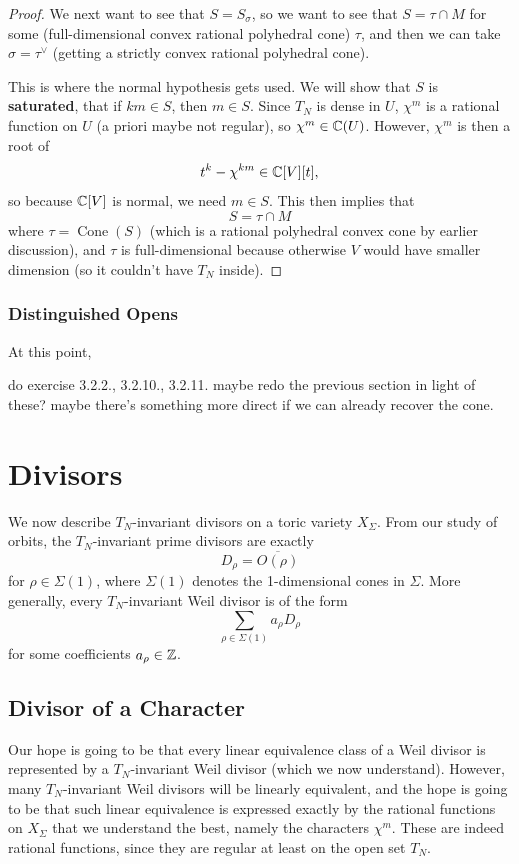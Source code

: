 \documentclass[12pt]{article}
\DeclareMathOperator{\Cone}{Cone}
\begin{document}
\begin{proof}
    We next want to see that $S=S_\sigma$, so we want to see that $S=\tau \cap M$ for some (full-dimensional convex rational polyhedral cone) $\tau$, and then we can take $\sigma = \tau^\vee$ (getting a strictly convex rational polyhedral cone).

    This is where the normal hypothesis gets used. We will show that $S$ is \textbf{saturated}, that if $km\in S$, then $m\in S$. Since $T_N$ is dense in $U$, $\chi^m$ is a rational function on $U$ (a priori maybe not regular), so $\chi^m \in \mathbb{C}(U)$. However, $\chi^m$ is then a root of
    \[t^k - \chi^{km} \in \mathbb{C}[V][t],\]
    so because $\mathbb{C}[V]$ is normal, we need $m \in S$. This then implies that
    \[S = \tau \cap M\]
    where $\tau = \Cone(S)$ (which is a rational polyhedral convex cone by earlier discussion), and $\tau$ is full-dimensional because otherwise $V$ would have smaller dimension (so it couldn't have $T_N$ inside).
\end{proof}

\subsubsection{Distinguished Opens}



At this point, 

do exercise 3.2.2., 3.2.10., 3.2.11.
maybe redo the previous section in light of these? maybe there's something more direct if we can already recover the cone.

\section{Divisors}

We now describe $T_N$-invariant divisors on a toric variety $X_\Sigma$. From our study of orbits, the $T_N$-invariant prime divisors are exactly
\[D_\rho = \overline{O(\rho)}\]
for $\rho \in \Sigma(1)$, where $\Sigma(1)$ denotes the 1-dimensional cones in $\Sigma$. More generally, every $T_N$-invariant Weil divisor is of the form
\[\sum_{\rho\in \Sigma(1)} a_\rho D_\rho\]
for some coefficients $a_\rho \in \mathbb{Z}$.

\subsection{Divisor of a Character}
Our hope is going to be that every linear equivalence class of a Weil divisor is represented by a $T_N$-invariant Weil divisor (which we now understand). However, many $T_N$-invariant Weil divisors will be linearly equivalent, and the hope is going to be that such linear equivalence is expressed exactly by the rational functions on $X_\Sigma$ that we understand the best, namely the characters $\chi^m$. These are indeed rational functions, since they are regular at least on the open set $T_N$.
\end{document}
